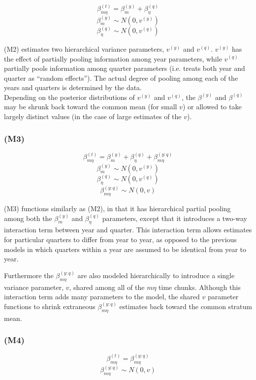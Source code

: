 \documentclass[12pt]{article}
\begin{document}
\[\beta^{(t)}_{m\eta} = \beta^{(y)}_{m} + \beta^{(q)}_{\eta}\]
\[\beta^{(y)}_{m} \sim N(0, v^{(y)})\]
\[\beta^{(q)}_{\eta} \sim N(0, v^{(q)})\]

(M2) estimates two hierarchical variance parameters, \(v^{(y)}\) and
\(v^{(q)}\). \(v^{(y)}\) has the effect of partially pooling information
among year parameters, while \(v^{(q)}\) partially pools information
among quarter parameters (i.e. treats both year and quarter as ``random
effects''). The actual degree of pooling among each of the years and
quarters is determined by the data.\\
Depending on the posterior distributions of \(v^{(y)}\) and \(v^{(q)}\),
the \(\beta^{(y)}\) and \(\beta^{(q)}\) may be shrunk back toward the
common mean (for small \(v\)) or allowed to take largely distinct values
(in the case of large estimates of the \(v\)).

\subsubsection{(M3)}\label{m3}

\[\beta^{(t)}_{m\eta} = \beta^{(y)}_{m} + \beta^{(q)}_{\eta} + \beta^{(y:q)}_{m\eta}\]
\[\beta^{(y)}_{m} \sim N(0, v^{(y)})\]
\[\beta^{(q)}_{\eta} \sim N(0, v^{(q)})\]
\[\beta^{(y:q)}_{m\eta} \sim N(0, v)\]

(M3) functions similarly as (M2), in that it has hierarchical partial
pooling among both the \(\beta^{(y)}_{m}\) and \(\beta^{(q)}_{\eta}\)
parameters, except that it introduces a two-way interaction term between
year and quarter. This interaction term allows estimates for particular
quarters to differ from year to year, as opposed to the previous models
in which quarters within a year are assumed to be identical from year to
year.

Furthermore the \(\beta^{(y:q)}_{m\eta}\) are also modeled
hierarchically to introduce a single variance parameter, \(v\), shared
among all of the \(m\eta\) time chunks. Although this interaction term
adds many parameters to the model, the shared \(v\) parameter functions
to shrink extraneous \(\beta^{(y:q)}_{m\eta}\) estimates back toward the
common stratum mean.

\subsubsection{(M4)}\label{m4}

\[\beta^{(t)}_{m\eta} = \beta^{(y:q)}_{m\eta}\]
\[\beta^{(y:q)}_{m\eta} \sim N(0, v)\]
\end{document}
